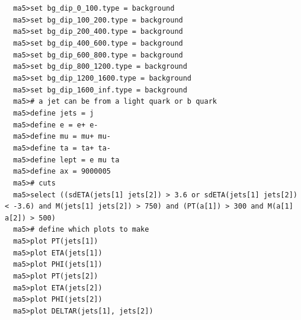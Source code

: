 \documentclass[a4paper, 10pt]{article}
\begin{document}
\texttt{ }\texttt{ }\texttt{ma5>set bg\_dip\_0\_100.type = background\\
}
\texttt{ }\texttt{ }\texttt{ma5>set bg\_dip\_100\_200.type = background\\
}
\texttt{ }\texttt{ }\texttt{ma5>set bg\_dip\_200\_400.type = background\\
}
\texttt{ }\texttt{ }\texttt{ma5>set bg\_dip\_400\_600.type = background\\
}
\texttt{ }\texttt{ }\texttt{ma5>set bg\_dip\_600\_800.type = background\\
}
\texttt{ }\texttt{ }\texttt{ma5>set bg\_dip\_800\_1200.type = background\\
}
\texttt{ }\texttt{ }\texttt{ma5>set bg\_dip\_1200\_1600.type = background\\
}
\texttt{ }\texttt{ }\texttt{ma5>set bg\_dip\_1600\_inf.type = background\\
}
\texttt{ }\texttt{ }\texttt{ma5>\# a jet can be from a light quark or b quark\\
}
\texttt{ }\texttt{ }\texttt{ma5>define jets = j\\
}
\texttt{ }\texttt{ }\texttt{ma5>define e = e+ e-\\
}
\texttt{ }\texttt{ }\texttt{ma5>define mu = mu+ mu-\\
}
\texttt{ }\texttt{ }\texttt{ma5>define ta = ta+ ta-\\
}
\texttt{ }\texttt{ }\texttt{ma5>define lept = e mu ta\\
}
\texttt{ }\texttt{ }\texttt{ma5>define ax = 9000005\\
}
\texttt{ }\texttt{ }\texttt{ma5>\# cuts\\
}
\texttt{ }\texttt{ }\texttt{ma5>select ((sdETA(jets[1] jets[2]) > 3.6 or sdETA(jets[1] jets[2]) < -3.6) and M(jets[1] jets[2]) > 750) and (PT(a[1]) > 300 and M(a[1] a[2]) > 500)\\
}
\texttt{ }\texttt{ }\texttt{ma5>\# define which plots to make\\
}
\texttt{ }\texttt{ }\texttt{ma5>plot PT(jets[1])\\
}
\texttt{ }\texttt{ }\texttt{ma5>plot ETA(jets[1])\\
}
\texttt{ }\texttt{ }\texttt{ma5>plot PHI(jets[1])\\
}
\texttt{ }\texttt{ }\texttt{ma5>plot PT(jets[2])\\
}
\texttt{ }\texttt{ }\texttt{ma5>plot ETA(jets[2])\\
}
\texttt{ }\texttt{ }\texttt{ma5>plot PHI(jets[2])\\
}
\texttt{ }\texttt{ }\texttt{ma5>plot DELTAR(jets[1], jets[2])\\
}
\end{document}
